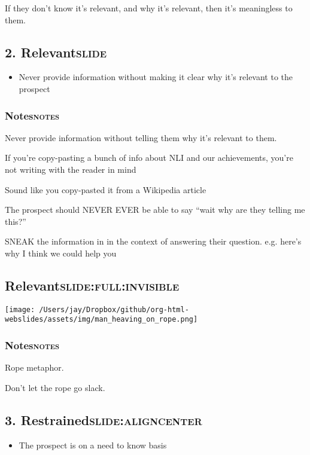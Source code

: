 \documentclass[11pt]{article}
\begin{document}
If they don't know it's relevant, and why it's relevant, then it's meaningless to them.

\subsection{2. Relevant\hfill{}\textsc{slide}}
\label{sec:org4c0048b}
\begin{itemize}
\item Never provide information without making it clear why it's relevant to the prospect
\end{itemize}

\subsubsection{Notes\hfill{}\textsc{notes}}
\label{sec:org89c0a7b}
Never provide information without telling them why it's relevant to them.

If you're copy-pasting a bunch of info about NLI and our achievements, you're not writing with the reader in mind

Sound like you copy-pasted it from a Wikipedia article

The prospect should NEVER EVER be able to say ``wait why are they telling me this?''

SNEAK the information in in the context of answering their question. e.g. here's why I think we could help you

\subsection{Relevant\hfill{}\textsc{slide:full:invisible}}
\label{sec:org42a4eaf}
\begin{center}
\texttt{[image: /Users/jay/Dropbox/github/org-html-webslides/assets/img/man\_heaving\_on\_rope.png]}
\end{center}

\subsubsection{Notes\hfill{}\textsc{notes}}
\label{sec:orga75b2b8}
Rope metaphor.

Don't let the rope go slack.

\subsection{3. Restrained\hfill{}\textsc{slide:aligncenter}}
\label{sec:org3f7ea77}
\begin{itemize}
\item The prospect is on a need to know basis
\end{itemize}
\end{document}
